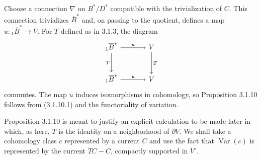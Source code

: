 Choose a connection $\nabla$ on $B^*/D^*$ compatible with the
trivialization of $C$.  This connection trivializes $\overline B^*$
and, on passing to the quotient, defines a map
$u:{}_1\overline B^*\to V$.  For $T$ defined as in 3.1.3, the diagram
\[
\begin{tikzcd}[column sep=large,row sep=large]
{}_1\overline B^* \arrow[r,"u"] \arrow[d,"T"']
  & V \arrow[d,"T"] \\
{}_1\overline B^* \arrow[r,"u"]
  & V
\end{tikzcd}
\]
commutes.  The map $u$ induces isomorphisms in cohomology, so
Proposition 3.1.10 follows from (3.1.10.1) and the functoriality of
variation.

Proposition 3.1.10 is meant to justify an explicit calculation to be
made later in which, as here, $T$ is the identity on a neighborhood
of $\partial V$.  We shall take a cohomology class $c$ represented by
a current $C$ and use the fact that $\operatorname{Var}(c)$ is
represented by the current $TC-C$, compactly supported in $V^\circ$.

